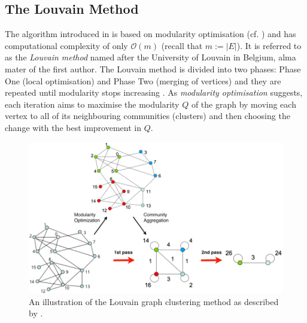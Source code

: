 \documentclass[12pt, a4paper]{article}
\begin{document}
  \subsection{The Louvain Method}
  \label{sec:louvain}
  The algorithm introduced in \cite{lambiotte-louvain-clustering} is based on modularity optimisation (cf. ) and has computational complexity of only $\mathcal{O}(m)$ (recall that $m := |E|$).
  It is referred to as the \textit{Louvain method} named after the University of Louvain in Belgium, alma mater of the first author.
  The Louvain method is divided into two phases: Phase One (local optimisation) and Phase Two (merging of vertices) and they are repeated until modularity stops increasing \parencite{lambiotte-louvain-clustering}.
  As \textit{modularity optimisation} suggests, each iteration aims to maximise the modularity $Q$ of the graph by moving each vertex to all of its neighbouring communities (clusters) and then choosing the change with the best improvement in $Q$.

  \begin{figure}[H]
    \centering
    \includegraphics[width=\linewidth]{figures/blondel.png}
    \caption{An illustration of the Louvain graph clustering method as described by \cite{lambiotte-louvain-clustering}.}
  \end{figure}
\end{document}
